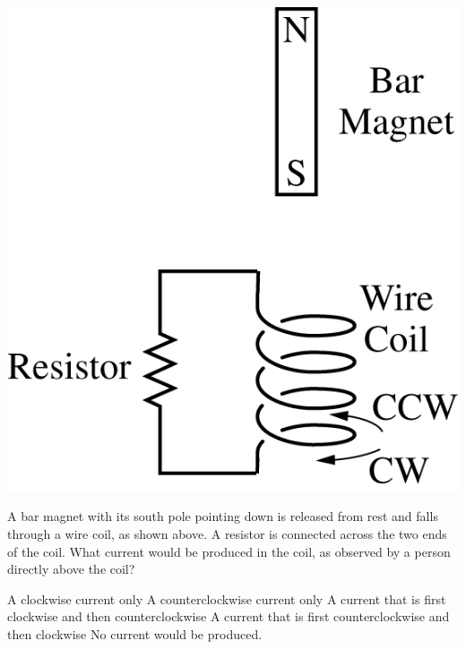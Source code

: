 
\begin{center}
    \includegraphics[scale=0.3]{images/img-016-033.png}
\end{center}

\begin{questions}\setcounter{question}{34}\question
A bar magnet with its south pole pointing down is released from rest and falls through a wire coil, as shown above. A resistor is connected across the two ends of the coil. What current would be produced in the coil, as observed by a person directly above the coil?

\begin{choices}
    \choice A clockwise current only
    \choice A counterclockwise current only
    \choice A current that is first clockwise and then counterclockwise
    \choice A current that is first counterclockwise and then clockwise
    \choice No current would be produced.
\end{choices}
\end{questions}
